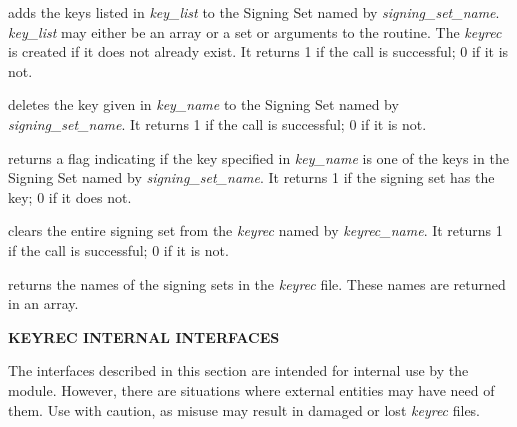 \begin{description}
\item {}

 adds the keys listed in {\it key\_list} to
the Signing Set named by {\it signing\_set\_name}.  {\it key\_list} may either
be an array or a set or arguments to the routine.  The {\it keyrec} is created
if it does not already exist.  It returns 1 if the call is successful; 0 if it
is not.

\item {}

 deletes the key given in {\it key\_name} to
the Signing Set named by {\it signing\_set\_name}.  It returns 1 if the call
is successful; 0 if it is not.

\item {}

 returns a flag indicating if the key
specified in {\it key\_name} is one of the keys in the Signing Set named by
{\it signing\_set\_name}.  It returns 1 if the signing set has the key; 0 if
it does not.

\item {}

 clears the entire signing set from the {\it
keyrec} named by {\it keyrec\_name}.  It returns 1 if the call is successful;
0 if it is not.

\item {}

 returns the names of the signing sets in the {\it
keyrec} file.  These names are returned in an array.

\end{description}

{\bf KEYREC INTERNAL INTERFACES}

The interfaces described in this section are intended for internal use by the
 module.  However, there are situations where external
entities may have need of them.  Use with caution, as misuse may result in
damaged or lost {\it keyrec} files.

